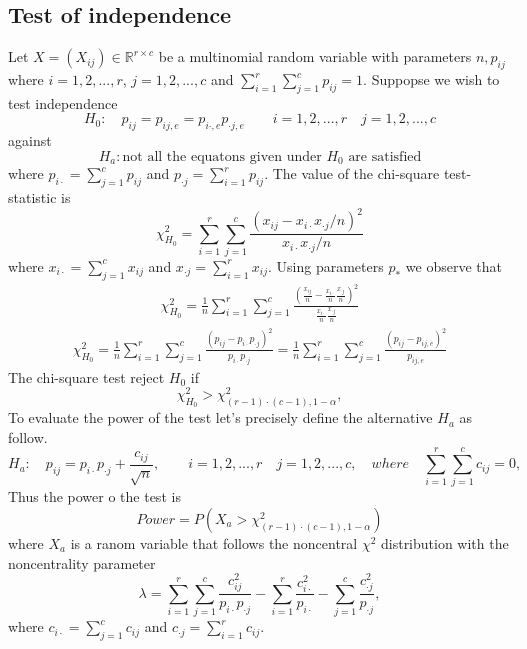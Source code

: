 \documentclass{article}
\begin{document}
\subsection{Test of independence}
Let $X=(X_{ij}) \in \mathbb{R}^{r \times c}$ be a multinomial random variable with
parameters $n,p_{ij}$ where $i=1,2,...,r$, $j=1,2,...,c$ and 
$\sum_{i=1}^r\sum_{j=1}^cp_{ij}=1$. 
Suppopse we wish to test independence
\begin{equation}
    H_0: \quad p_{ij}=p_{ij,e}=p_{i \cdot, e}p_{\cdot j, e} \qquad i =1,2,...,r \quad j=1,2,...,c
\end{equation}
against
\begin{equation}
    H_a: \mbox{not all the equatons given under $H_0$ are satisfied}
\end{equation}
where $p_{i \cdot} = \sum_{j=1}^c p_{ij}$ and $p_{\cdot j} = \sum_{i=1}^r p_{ij}$.
The value of the chi-square test-statistic is
\begin{equation}
    \chi^2_{H_0} = \sum_{i=1}^r\sum_{j=1}^c \frac{\left(x_{ij} - x_{i \cdot}x_{\cdot j}/n\right)^2}{x_{i \cdot}x_{\cdot j}/n}
\end{equation}
where $x_{i \cdot} = \sum_{j=1}^c x_{ij}$ and $x_{\cdot j} = \sum_{i=1}^r x_{ij}$.
Using parameters $p_{*}$ we observe that
\begin{align}
    \chi^2_{H_0} =\frac{1}{n} \sum_{i=1}^r\sum_{j=1}^c \frac{\left(\frac{x_{ij}}{n} - \frac{x_{i \cdot}}{n}\frac{x_{\cdot j}}{n}\right)^2}{\frac{x_{i \cdot}}{n}\frac{x_{\cdot j}}{n}}
\end{align}
\begin{align}
    \chi^2_{H_0} =  \frac{1}{n} \sum_{i=1}^r\sum_{j=1}^c \frac{\left(p_{ij} - p_{i \cdot}p_{\cdot j}\right)^2}{p_{i \cdot}p_{\cdot j}} = \frac{1}{n}  \sum_{i=1}^r\sum_{j=1}^c \frac{\left(p_{ij} - p_{ij,e}\right)^2}{p_{ij,e}} 
\end{align}
The chi-square test reject $H_0$ if
\begin{equation}
    \chi^2_{H_0} > \chi^2_{(r-1)\cdot(c-1),1-\alpha},
\end{equation}
To evaluate the power of the test let's precisely define the alternative $H_a$ as follow.
\begin{equation}
    H_a: \quad p_{ij} = p_{i\cdot}p_{\cdot j} + \frac{c_{ij}}{\sqrt{n}}, \qquad i =1,2,...,r \quad j=1,2,...,c, \quad where \quad \sum_{i=1}^{r}\sum_{j=1}^{c}c_{ij}=0, 
\end{equation}
Thus the power o the test is
\begin{equation}
    Power = P\left(X_a > \chi^2_{(r-1)\cdot(c-1),1-\alpha}\right)
\end{equation}
where $X_a$ is a ranom variable that follows the noncentral $\chi^2$ distribution with the noncentrality parameter
\begin{equation}
    \lambda = \sum_{i=1}^{r}\sum_{j=1}^c \frac{c_{ij}^2}{p_{i\cdot}p_{\cdot j}} - \sum_{i=1}^{r}\frac{c_{i \cdot}^2}{p_{i \cdot}} - \sum_{j=1}^{c}\frac{c_{\cdot j}^2}{p_{\cdot j}},
\end{equation}
where $c_{i \cdot} = \sum_{j=1}^c c_{ij}$ and $c_{\cdot j} = \sum_{i=1}^r c_{ij}$.
\end{document}
